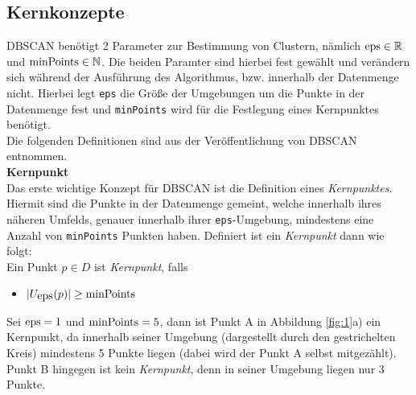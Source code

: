 \documentclass{lni}
\begin{document}
\begin{minipage}{\textwidth}

\subsection{Kernkonzepte}
\label{sec:kern}
DBSCAN benötigt 2 Parameter zur Bestimmung von Clustern, nämlich $\lstinline{eps} \in \mathbb{R}$ und $\lstinline{minPoints} \in \mathbb{N}$. Die beiden Paramter sind hierbei fest gewählt und verändern sich während der Ausführung des Algorithmus, bzw. innerhalb der Datenmenge nicht. Hierbei legt \lstinline{eps} die Größe der Umgebungen um die Punkte in der Datenmenge fest und \lstinline{minPoints} wird für die Festlegung eines Kernpunktes benötigt.\\
Die folgenden Definitionen sind aus der Veröffentlichung von DBSCAN \cite{DBSCAN} entnommen.\\


\textbf{Kernpunkt}\\
Das erste wichtige Konzept für DBSCAN ist die Definition eines \textit{Kernpunktes}. Hiermit sind die Punkte in der Datenmenge gemeint, welche innerhalb ihres näheren Umfelds, genauer innerhalb ihrer \lstinline{eps}-Umgebung, mindestens eine Anzahl von \lstinline{minPoints} Punkten haben. Definiert ist ein \textit{Kernpunkt} dann wie folgt:\\
Ein Punkt $ p \in D $ ist \textit{Kernpunkt}, falls
\begin{itemize}
    \item $ | U_{\lstinline{eps}}(p) | \geq \lstinline{minPoints}  $
\end{itemize}
Sei $\lstinline{eps} = 1$ und $\lstinline{minPoints} = 5$, dann ist Punkt A in Abbildung \ref{fig:1}a) ein Kernpunkt, da innerhalb seiner Umgebung (dargestellt durch den gestrichelten Kreis) mindestens 5 Punkte liegen (dabei wird der Punkt A selbst mitgezählt). Punkt B hingegen ist kein \textit{Kernpunkt}, denn in seiner Umgebung liegen nur 3 Punkte.\\



\end{minipage}
\end{document}
